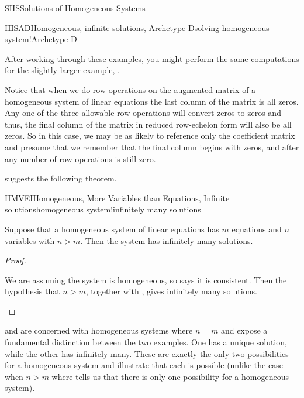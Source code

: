 \begin{subsect}{SHS}{Solutions of Homogeneous Systems}
\begin{example}{HISAD}{Homogeneous, infinite solutions, Archetype D}{solving homogeneous system!Archetype D}
\begin{para}
\end{para}
%
\end{example}
%
\begin{para}After working through these examples, you might perform the same computations for the slightly larger example, .\end{para}
%
\begin{para}Notice that when we do row operations on the augmented matrix of a homogeneous system of linear equations the last column of the matrix is all zeros.  Any one of the three allowable row operations will convert zeros to zeros and thus, the final column of the matrix in reduced row-echelon form will also be all zeros.  So in this case, we may be as likely to reference only the coefficient matrix and presume that we remember that the final column begins with zeros, and after any number of row operations is still zero.\end{para}
%
\begin{para} suggests the following theorem.\end{para}
%
\begin{theorem}{HMVEI}{Homogeneous, More Variables than Equations, Infinite solutions}{homogeneous system!infinitely many solutions}
\begin{para}Suppose that a homogeneous system of linear equations has $m$ equations and $n$ variables with $n>m$.  Then the system has infinitely many solutions.\end{para}
\end{theorem}
%
\begin{proof}
\begin{para}We are assuming the system is homogeneous, so  says it is consistent.  Then the hypothesis that $n>m$, together with , gives infinitely many solutions.\end{para}
\end{proof}
%
\begin{para} and  are concerned with homogeneous systems where $n=m$ and expose a fundamental distinction between the two examples.  One has a unique solution, while the other has infinitely many.  These are exactly the only two possibilities for a homogeneous system and illustrate that each is possible
(unlike the case when $n>m$
where  tells us that there is only one possibility for a homogeneous system).\end{para}
%
%
\end{subsect}
